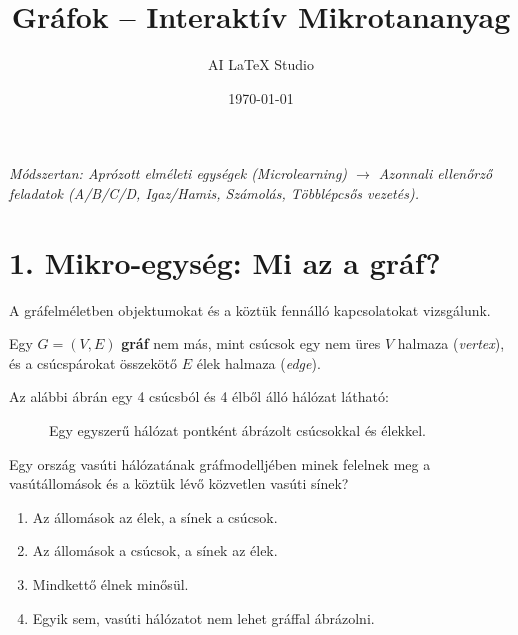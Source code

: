 \documentclass[a4paper,12pt]{article}
\title{Gráfok -- Interaktív Mikrotananyag}
\author{AI LaTeX Studio}
\date{\today}
\begin{document}
\maketitle

\begin{center}
    \textit{Módszertan: Aprózott elméleti egységek (Microlearning) $\longrightarrow$ Azonnali ellenőrző feladatok (A/B/C/D, Igaz/Hamis, Számolás, Többlépcsős vezetés).}
\end{center}

\vspace{0.5cm}

\section{1. Mikro-egység: Mi az a gráf?}

A gráfelméletben objektumokat és a köztük fennálló kapcsolatokat vizsgálunk.

\begin{definiciodoboz}
Egy $G = (V, E)$ \textbf{gráf} nem más, mint csúcsok egy nem üres $V$ halmaza (\textit{vertex}), és a csúcspárokat összekötő $E$ élek halmaza (\textit{edge}).
\end{definiciodoboz}

Az alábbi ábrán egy 4 csúcsból és 4 élből álló hálózat látható:

\begin{figure}[H]
    \centering
    \caption{Egy egyszerű hálózat pontként ábrázolt csúcsokkal és élekkel.}
\end{figure}

\begin{feladatdoboz}
Egy ország vasúti hálózatának gráfmodelljében minek felelnek meg a vasútállomások és a köztük lévő közvetlen vasúti sínek?
\begin{enumerate}[label=(\Alph*)]
    \item Az állomások az élek, a sínek a csúcsok.
    \item Az állomások a csúcsok, a sínek az élek.
    \item Mindkettő élnek minősül.
    \item Egyik sem, vasúti hálózatot nem lehet gráffal ábrázolni.
\end{enumerate}
\end{feladatdoboz}
\end{document}
